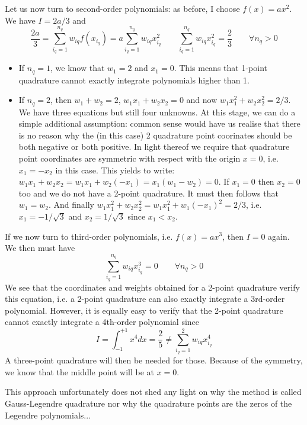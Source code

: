 Let us now turn to second-order polynomials: as before, I choose $f(x)=a x^2$. We have 
$I=2a/3$ and 
\begin{equation}
\frac{2a}{3} = \sum_{i_q=1}^{n_q} w_{iq} f(x_{i_q})  = a \sum_{i_q=1}^{n_q} w_{iq} x_{i_q}^2 
\qquad
\boxed{
\sum_{i_q=1}^{n_q} w_{iq} x^2_{i_q} = \frac{2}{3}\qquad \forall n_q>0
}
\label{eq:glqthree}
\end{equation}
\begin{itemize}
\item
If $n_q=1$,  we know that $w_1=2$ and $x_1=0$. This means that 1-point quadrature cannot exactly integrate polynomials 
higher than 1.
\item
If $n_q=2$, then $w_1+w_2=2$, $w_1x_1+w_2x_2 =0$ and now $w_1x_1^2+w_2x_2^2 =2/3$. We have three equations but still four unknowns. At this stage, we can do a simple additional assumption: common sense would have us realise that there is no 
reason why the (in this case) 2 quadrature point coorinates should be both negative or both positive. In light thereof we require that quadrature point coordinates are symmetric with respect with the origin $x=0$, i.e. $x_1=-x_2$ in this case.
This yields to write:  $w_1x_1+w_2x_2 = w_1x_1+w_2(-x_1)=x_1(w_1-w_2)=0$. If $x_1=0$ then $x_2=0$ too and we do not 
have a 2-point quadrature. It must then follows that $w_1=w_2$. And finally 
$w_1x_1^2+w_2x_2^2 = w_1 x_1^2 + w_1 (-x_1)^2=2/3$, i.e. $x_1=-1/\sqrt{3}$ and $x_2=1/\sqrt{3}$ since $x_1<x_2$.
\end{itemize}

If we now turn to third-order polynomials, i.e. $f(x)=ax^3$, then $I=0$ again. We then must have
\begin{equation}
\boxed{
\sum_{i_q=1}^{n_q} w_{iq} x^3_{i_q} =  0  \qquad \forall n_q>0
}
\end{equation}
We see that the coordinates and weights obtained for a 2-point quadrature verify this equation, i.e. 
a 2-point quadrature can also exactly integrate a 3rd-order polynomial.
However, it is equally easy to verify that the 2-point quadrature cannot exactly integrate a 4th-order polynomial
since 
\[
I= \int_{-1}^{+1} x^4 dx = \frac{2}{5} \neq  \sum_{i_q=1}^{2} w_{iq} x_{i_q}^4
\]
A three-point quadrature will then be needed for those. Because of the symmetry, we know that the middle
point will be at $x=0$.

\begin{remark} 
This approach unfortunately does not shed any light on why the method is called Gauss-Legendre quadrature
nor why the quadrature points are the zeros of the Legendre polynomials...
\end{remark}


